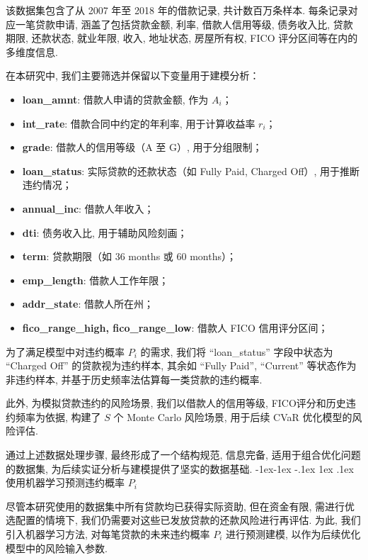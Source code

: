 \documentclass[12pt,nonblindrev]{write_paper}
\makeatletter
\renewcommand\subsection{\@startsection{subsection}{2}{\z@}%
                                     {-1ex\@plus -1ex \@minus -.1ex}%
                                     {1ex \@plus .1ex}%
                                     {\normalfont \normalsize \bfseries}}
\makeatother
\begin{document}
该数据集包含了从 2007 年至 2018 年的借款记录, 共计数百万条样本. 每条记录对应一笔贷款申请, 涵盖了包括贷款金额, 利率, 借款人信用等级, 债务收入比, 贷款期限, 还款状态, 就业年限, 收入, 地址状态, 房屋所有权, FICO 评分区间等在内的多维度信息. 

在本研究中, 我们主要筛选并保留以下变量用于建模分析：

\begin{itemize}
  \item \textbf{loan\_amnt}: 借款人申请的贷款金额, 作为 $A_i$；
  \item \textbf{int\_rate}: 借款合同中约定的年利率, 用于计算收益率 $r_i$；
  \item \textbf{grade}: 借款人的信用等级（A 至 G）, 用于分组限制；
  \item \textbf{loan\_status}: 实际贷款的还款状态（如 Fully Paid, Charged Off）, 用于推断违约情况；
  \item \textbf{annual\_inc}: 借款人年收入；
  \item \textbf{dti}: 债务收入比, 用于辅助风险刻画；
  \item \textbf{term}: 贷款期限（如 36 months 或 60 months）；
  \item \textbf{emp\_length}: 借款人工作年限；
  \item \textbf{addr\_state}: 借款人所在州；
  \item \textbf{fico\_range\_high, fico\_range\_low}: 借款人 FICO 信用评分区间；
\end{itemize}

为了满足模型中对违约概率 $P_i$ 的需求, 我们将 ``loan\_status'' 字段中状态为 ``Charged Off'' 的贷款视为违约样本, 其余如 ``Fully Paid'', ``Current'' 等状态作为非违约样本, 并基于历史频率法估算每一类贷款的违约概率. 

此外, 为模拟贷款违约的风险场景, 我们以借款人的信用等级, FICO评分和历史违约频率为依据, 构建了 $S$ 个 Monte Carlo 风险场景, 用于后续 CVaR 优化模型的风险评估. 

通过上述数据处理步骤, 最终形成了一个结构规范, 信息完备, 适用于组合优化问题的数据集, 为后续实证分析与建模提供了坚实的数据基础. 
\subsection{使用机器学习预测违约概率 $P_i$}
\label{subsec:predict_p_i}

尽管本研究使用的数据集中所有贷款均已获得实际资助, 但在资金有限, 需进行优选配置的情境下, 我们仍需要对这些已发放贷款的还款风险进行再评估. 为此, 我们引入机器学习方法, 对每笔贷款的未来违约概率 $P_i$ 进行预测建模, 以作为后续优化模型中的风险输入参数. 
\end{document}
